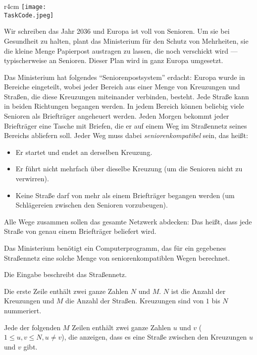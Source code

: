 \documentclass{boi2014-de}
\renewcommand{\TaskCode}{postmen}
\begin{document}
    \begin{wrapfigure}[8]{r}{4cm}
        \vspace{-18pt}
		\texttt{[image: \\TaskCode.jpeg]}
	\end{wrapfigure}
    Wir schreiben das Jahr 2036 und Europa ist voll von Senioren. Um sie bei Gesundheit zu halten, plant das Ministerium für den Schutz von Mehrheiten, sie die kleine Menge Papierpost austragen zu lassen, die noch verschickt wird --- typischerweise an Senioren. Dieser Plan wird in ganz Europa umgesetzt.
    
    Das Ministerium hat folgendes ``Seniorenpostsystem'' erdacht: Europa wurde in Bereiche eingeteilt, wobei jeder Bereich aus einer Menge von Kreuzungen und Straßen, die diese Kreuzungen miteinander verbinden, besteht. Jede Straße kann in beiden Richtungen begangen werden. In jedem Bereich können beliebig viele Senioren als Briefträger angeheuert werden. Jeden Morgen bekommt jeder Briefträger eine Tasche mit Briefen, die er auf einem Weg im Straßennetz seines Bereichs abliefern soll. Jeder Weg muss dabei \emph{seniorenkompatibel} sein, das heißt:

    \begin{itemize}
        \item Er startet und endet an derselben Kreuzung.
        \item Er führt nicht mehrfach über dieselbe Kreuzung (um die Senioren nicht zu verwirren).
        \item Keine Straße darf von mehr als einem Briefträger begangen werden (um Schlägereien zwischen den Senioren vorzubeugen).
    \end{itemize}
    
    Alle Wege zusammen sollen das gesamte Netzwerk abdecken: Das heißt, dass jede Straße von genau einem Briefträger beliefert wird.

    \Task
    Das Ministerium benötigt ein Computerprogramm, das für ein gegebenes Straßennetz eine solche Menge von seniorenkompatiblen Wegen berechnet.

    \Input
    Die Eingabe beschreibt das Straßennetz.
  
    Die erste Zeile enthält zwei ganze Zahlen $N$ und $M$.
    $N$ ist die Anzahl der Kreuzungen und $M$ die Anzahl der Straßen.
    Kreuzungen sind von $1$ bis $N$ nummeriert.
  
    Jede der folgenden $M$ Zeilen enthält zwei ganze Zahlen $u$ und $v$
    ($1 \le u, v \le N, u \neq v$), die anzeigen, dass es eine Straße zwischen den Kreuzungen $u$ und $v$ gibt.
\end{document}
